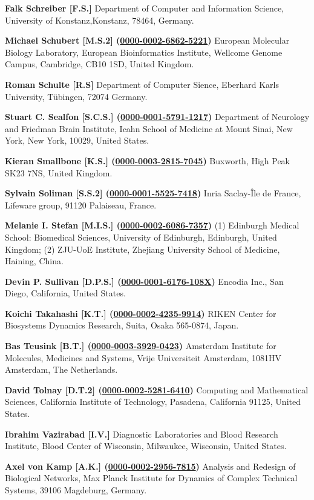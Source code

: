 \documentclass{sbml-paper}
\newcommand{\orcid}[1]{\href{https://orcid.org/#1}{#1}}
\begin{document}
\textbf{Falk Schreiber [F.S.]} Department of Computer and Information Science, University of Konstanz,Konstanz, 78464, Germany.

\textbf{Michael Schubert [M.S.2] (\orcid{0000-0002-6862-5221})} European Molecular Biology Laboratory, European Bioinformatics Institute, Wellcome Genome Campus, Cambridge, CB10 1SD, United Kingdom.

\textbf{Roman Schulte [R.S]} Department of Computer Sience, Eberhard Karls University, Tübingen, 72074 Germany.

\textbf{Stuart C. Sealfon [S.C.S.] (\orcid{0000-0001-5791-1217})} Department of Neurology and Friedman Brain Institute, Icahn School of Medicine at Mount Sinai, New York, New York, 10029, United States.

\textbf{Kieran Smallbone [K.S.] (\orcid{0000-0003-2815-7045})} Buxworth, High Peak SK23 7NS, United Kingdom.

\textbf{Sylvain Soliman [S.S.2] (\orcid{0000-0001-5525-7418})} Inria Saclay-Île de France, Lifeware group, 91120 Palaiseau, France.

\textbf{Melanie I. Stefan [M.I.S.] (\orcid{0000-0002-6086-7357})} (1) Edinburgh Medical School: Biomedical Sciences, University of Edinburgh, Edinburgh, United Kingdom; (2) ZJU-UoE Institute, Zhejiang University School of Medicine, Haining, China.

\textbf{Devin P. Sullivan [D.P.S.] (\orcid{0000-0001-6176-108X})} Encodia Inc., San Diego, California, United States.

\textbf{Koichi Takahashi [K.T.] (\orcid{0000-0002-4235-9914})} RIKEN Center for Biosystems Dynamics Research, Suita, Osaka 565-0874, Japan.

\textbf{Bas Teusink [B.T.] (\orcid{0000-0003-3929-0423})} Amsterdam Institute for Molecules, Medicines and Systems, Vrije Universiteit Amsterdam, 1081HV Amsterdam, The Netherlands.

\textbf{David Tolnay [D.T.2] (\orcid{0000-0002-5281-6410})} Computing and Mathematical Sciences, California Institute of Technology, Pasadena, California 91125, United States.

\textbf{Ibrahim Vazirabad [I.V.]} Diagnostic Laboratories and Blood Research Institute, Blood Center of Wisconsin, Milwaukee, Wisconsin, United States.

\textbf{Axel von Kamp [A.K.] (\orcid{0000-0002-2956-7815})} Analysis and Redesign of Biological Networks, Max Planck Institute for Dynamics of Complex Technical Systems, 39106 Magdeburg, Germany.
\end{document}
